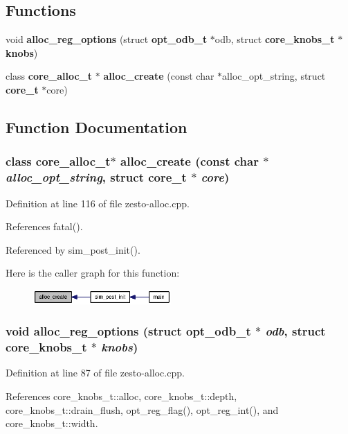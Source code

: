 \subsection*{Functions}
\begin{CompactItemize}
\item 
void {\bf alloc\_\-reg\_\-options} (struct {\bf opt\_\-odb\_\-t} $\ast$odb, struct {\bf core\_\-knobs\_\-t} $\ast${\bf knobs})
\item 
class {\bf core\_\-alloc\_\-t} $\ast$ {\bf alloc\_\-create} (const char $\ast$alloc\_\-opt\_\-string, struct {\bf core\_\-t} $\ast$core)
\end{CompactItemize}


\subsection{Function Documentation}
\subsubsection[{alloc\_\-create}]{\setlength{\rightskip}{0pt plus 5cm}class {\bf core\_\-alloc\_\-t}$\ast$ alloc\_\-create (const char $\ast$ {\em alloc\_\-opt\_\-string}, \/  struct {\bf core\_\-t} $\ast$ {\em core})}\label{zesto-alloc_8cpp_d5e0575b7db14c11053d5da87dab1708}




Definition at line 116 of file zesto-alloc.cpp.

References fatal().

Referenced by sim\_\-post\_\-init().

Here is the caller graph for this function:\nopagebreak
\begin{figure}[H]
\begin{center}
\leavevmode
\includegraphics[width=149pt]{zesto-alloc_8cpp_d5e0575b7db14c11053d5da87dab1708_icgraph}
\end{center}
\end{figure}
\subsubsection[{alloc\_\-reg\_\-options}]{\setlength{\rightskip}{0pt plus 5cm}void alloc\_\-reg\_\-options (struct {\bf opt\_\-odb\_\-t} $\ast$ {\em odb}, \/  struct {\bf core\_\-knobs\_\-t} $\ast$ {\em knobs})}\label{zesto-alloc_8cpp_958130a4752ea3e0b57acdab47cff685}




Definition at line 87 of file zesto-alloc.cpp.

References core\_\-knobs\_\-t::alloc, core\_\-knobs\_\-t::depth, core\_\-knobs\_\-t::drain\_\-flush, opt\_\-reg\_\-flag(), opt\_\-reg\_\-int(), and core\_\-knobs\_\-t::width.